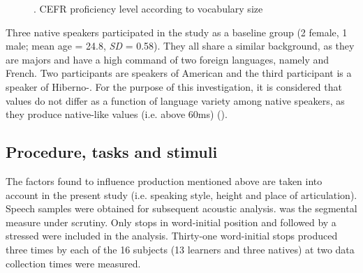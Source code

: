 \documentclass[output=paper]{langsci/langscibook}
\begin{document}
  
\begin{figure}
\caption{\label{fig:monje:2}. CEFR proficiency level according to vocabulary size} 
\end{figure}



   Three native speakers participated in the study as a baseline group (2 female, 1 male; mean age = 24.8, \textit{SD} = 0.58). They all share a similar  background, as they are  majors and have a high command of two foreign languages, namely  and French. Two participants are speakers of American  and the third participant is a speaker of Hiberno-. For the purpose of this investigation, it is considered that  values do not differ as a function of language variety among native speakers, as they produce native-like values (i.e. above 60ms) (\citealt{LowensteinNittrouer2008}). 



\subsection{Procedure, tasks and stimuli}



The factors found to influence  production mentioned above are taken into account in the present study (i.e. speaking style,  height and place of articulation). Speech samples were obtained for subsequent acoustic analysis.  was the segmental measure under scrutiny. Only  stops in word-initial position and followed by a stressed  were included in the  analysis. Thirty-one word-initial  stops produced three times by each of the 16 subjects (13 learners and three natives) at two data collection times were measured.
\end{document}
